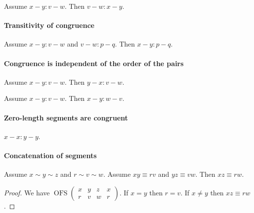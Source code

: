 \documentclass{article}
\newcommand{\Cong}[4]{#1 #2 \equiv #3 #4}
\newcommand{\Betw}[3]{#1 {\sim} #2 {\sim} #3}
\newcommand{\OFS}[8]{\operatorname{OFS}
\left(\begin{smallmatrix}%
#1 & #2 & #3 & #4 \\
#5 & #6 & #7 & #8
\end{smallmatrix}\right)%
}
\begin{document}
  \begin{forthel}
    \begin{lemma}[L2o2]
      Assume $x-y : v-w$. Then $v-w : x-y$.
    \end{lemma}
  \end{forthel}


  \paragraph{Transitivity of congruence}

  \begin{forthel}
    \begin{lemma}[L2o3]
      Assume $x-y : v-w$ and $v-w : p-q$. Then $x-y : p-q$.
    \end{lemma}
  \end{forthel}


  \paragraph{Congruence is independent of the order of the pairs}

  \begin{forthel}
    \begin{lemma}[L2o4]
      Assume $x-y : v-w$. Then $y-x : v-w$.
    \end{lemma}

    \begin{lemma}[L2o5]
      Assume $x-y : v-w$. Then $x-y : w-v$.
    \end{lemma}
  \end{forthel}


  \paragraph{Zero-length segments are congruent}

  \begin{forthel}
    \begin{lemma}[L2o8]
      $x-x : y-y$.
    \end{lemma}
  \end{forthel}


  \paragraph{Concatenation of segments}

  \begin{forthel}
    \begin{lemma} %
      Assume $\Betw{x}{y}{z}$ and $\Betw{r}{v}{w}$.
      Assume $\Cong{x}{y}{r}{v}$ and $\Cong{y}{z}{v}{w}$.
      Then $\Cong{x}{z}{r}{w}$.
    \end{lemma}
    \begin{proof}
      We have $\OFS{x}{y}{z}{x}{r}{v}{w}{r}$. %
      If $x = y$ then $r = v$.                %
      If $x \neq y$ then $\Cong{x}{z}{r}{w}$. %
    \end{proof}
  \end{forthel}
\end{document}
